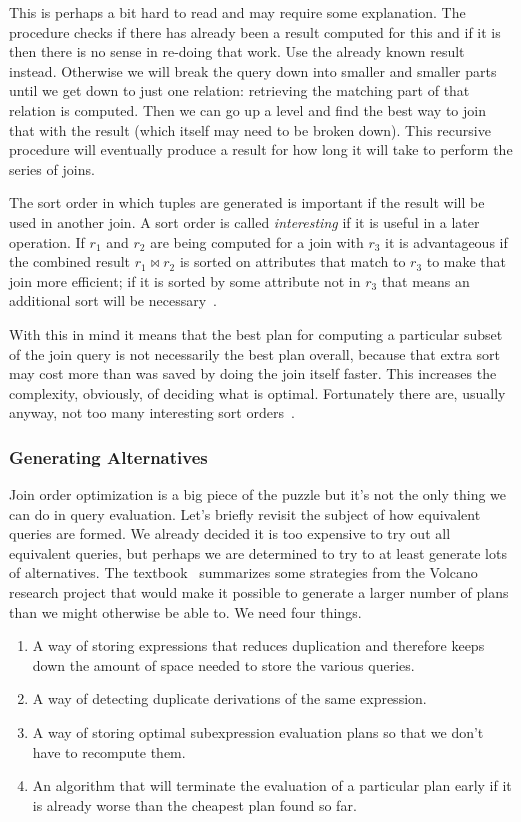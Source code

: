This is perhaps a bit hard to read and may require some explanation. The procedure checks if there has already been a result computed for this and if it is then there is no sense in re-doing that work. Use the already known result instead. Otherwise we will break the query down into smaller and smaller parts until we get down to just one relation: retrieving the matching part of that relation is computed. Then we can go up a level and find the best way to join that with the result (which itself may need to be broken down). This recursive procedure will eventually produce a result for how long it will take to perform the series of joins.

The sort order in which tuples are generated is important if the result will be used in another join. A sort order is called \textit{interesting} if it is useful in a later operation. If $r_{1}$ and $r_{2}$ are being computed for a join with $r_{3}$ it is advantageous if the combined result $r_{1} \bowtie r_{2}$ is sorted on attributes that match to $r_{3}$ to make that join more efficient; if it is sorted by some attribute not in $r_{3}$ that means an additional sort will be necessary~\cite{dsc}.

With this in mind it means that the best plan for computing a particular subset of the join query is not necessarily the best plan overall, because that extra sort may cost more than was saved by doing the join itself faster. This increases the complexity, obviously, of deciding what is optimal. Fortunately there are, usually anyway, not too many interesting sort orders~\cite{dsc}. 

\subsubsection*{Generating Alternatives}

Join order optimization is a big piece of the puzzle but it's not the only thing we can do in query evaluation. Let's briefly revisit the subject of how equivalent queries are formed. We already decided it is too expensive to try out all equivalent queries, but perhaps we are determined to try to at least generate lots of alternatives. The textbook~\cite{dsc} summarizes some strategies from the Volcano research project that would make it possible to generate a larger number of plans than we might otherwise be able to. We need four things.

\begin{enumerate}
	\item A way of storing expressions that reduces duplication and therefore keeps down the amount of space needed to store the various queries.
	\item A way of detecting duplicate derivations of the same expression.
	\item A way of storing optimal subexpression evaluation plans so that we don't have to recompute them.
	\item An algorithm that will terminate the evaluation of a particular plan early if it is already worse than the cheapest plan found so far.
\end{enumerate}

